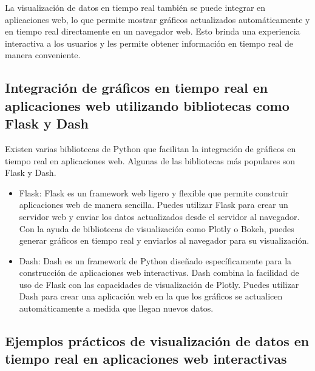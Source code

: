 \documentclass[
  a4paper,
]{article}
\begin{document}
La visualización de datos en tiempo real también se puede integrar en
aplicaciones web, lo que permite mostrar gráficos actualizados
automáticamente y en tiempo real directamente en un navegador web. Esto
brinda una experiencia interactiva a los usuarios y les permite obtener
información en tiempo real de manera conveniente.

\hypertarget{integraciuxf3n-de-gruxe1ficos-en-tiempo-real-en-aplicaciones-web-utilizando-bibliotecas-como-flask-y-dash}{%
\subsection{Integración de gráficos en tiempo real en aplicaciones web
utilizando bibliotecas como Flask y
Dash}\label{integraciuxf3n-de-gruxe1ficos-en-tiempo-real-en-aplicaciones-web-utilizando-bibliotecas-como-flask-y-dash}}

Existen varias bibliotecas de Python que facilitan la integración de
gráficos en tiempo real en aplicaciones web. Algunas de las bibliotecas
más populares son Flask y Dash.

\begin{itemize}
\item
  Flask: Flask es un framework web ligero y flexible que permite
  construir aplicaciones web de manera sencilla. Puedes utilizar Flask
  para crear un servidor web y enviar los datos actualizados desde el
  servidor al navegador. Con la ayuda de bibliotecas de visualización
  como Plotly o Bokeh, puedes generar gráficos en tiempo real y
  enviarlos al navegador para su visualización.
\item
  Dash: Dash es un framework de Python diseñado específicamente para la
  construcción de aplicaciones web interactivas. Dash combina la
  facilidad de uso de Flask con las capacidades de visualización de
  Plotly. Puedes utilizar Dash para crear una aplicación web en la que
  los gráficos se actualicen automáticamente a medida que llegan nuevos
  datos.
\end{itemize}

\hypertarget{ejemplos-pruxe1cticos-de-visualizaciuxf3n-de-datos-en-tiempo-real-en-aplicaciones-web-interactivas}{%
\subsection{Ejemplos prácticos de visualización de datos en tiempo real
en aplicaciones web
interactivas}\label{ejemplos-pruxe1cticos-de-visualizaciuxf3n-de-datos-en-tiempo-real-en-aplicaciones-web-interactivas}}
\end{document}
